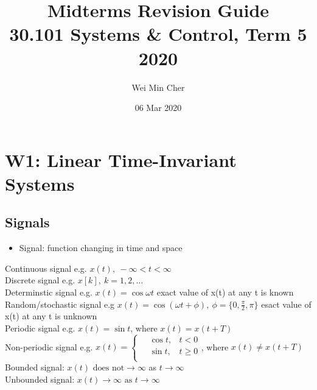 \documentclass[a4paper]{article}
\begin{document}
\title{Midterms Revision Guide\\[0.1cm]
    \large 30.101 Systems \& Control, Term 5 2020}
\author{Wei Min Cher}
\date{06 Mar 2020}

\maketitle

\tableofcontents

\newpage
\section{W1: Linear Time-Invariant Systems}
\subsection{Signals}
\begin{itemize}
    \item Signal: function changing in time and space
\end{itemize}
Continuous signal e.g. $x(t), \ -\infty<t<\infty$\\
Discrete signal e.g. $x[k], \ k = 1, 2,\ldots$\\
Determinstic signal e.g. $x(t) = \cos\omega t$ \quad exact value of x(t) at any t is known\\
Random/stochastic signal e.g $x(t) = \cos(\omega t+ \phi), \ \phi=\{0, \frac{\pi}{2}, \pi\}$ \quad esact value of x(t) at any t is unknown\\
Periodic signal e.g. $x(t) = \sin t$, where $x(t) = x(t+T)$\\
Non-periodic signal e.g. $x(t) = \begin{cases}
\quad\cos t, & t < 0\\
\quad\sin t, & t \geq 0\\
\end{cases}$\quad , where $x(t) \neq x(t+T)$\\
Bounded signal: $x(t)\text{ does not}\rightarrow \infty$ as $t\rightarrow\infty$\\
Unbounded signal: $x(t)\rightarrow\infty\text{ as }t\rightarrow\infty$
\end{document}
